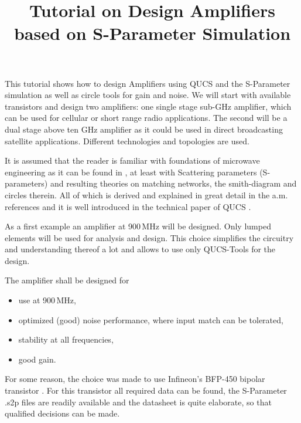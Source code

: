 \graphicspath{{./pics/}}
\title{Tutorial on Design Amplifiers based on S-Parameter Simulation}
\maketitle
{}

This tutorial shows how to design Amplifiers using QUCS \cite{qucs}
and the S-Parameter simulation as well as circle tools for gain and
noise. We will start with available transistors and design two
amplifiers: one single stage sub-GHz amplifier, which can be used for
cellular or short range radio applications. The second will be a dual
stage above ten GHz amplifier as it could be used in direct
broadcasting satellite applications. Different technologies and
topologies are used.

It is assumed that the reader is familiar with foundations of
microwave engineering as it can be found in \cite{col91,poz05}, at
least with Scattering parameters (S-parameters) and resulting theories
on matching networks, the smith-diagram and circles therein. All of
which is derived and explained in great detail in the a.m. references
and it is well introduced in the technical paper of QUCS \cite{qucs}.


As a first example an amplifier at 900\,MHz will be designed. Only
lumped elements will be used for analysis and design. This choice
simplifies the circuitry and understanding thereof a lot and allows to
use only QUCS-Tools for the design.

The amplifier shall be designed for
\begin{itemize}
\item use at 900\,MHz,
\item optimized (good) noise performance, where input match can be tolerated,
\item stability at all frequencies,
\item good gain.
\end{itemize}



For some reason, the choice was made to use Infineon's BFP-450 bipolar
transistor \cite{infbfp450}. For this transistor all required data can
be found, the S-Parameter .s2p files are readily available and the
datasheet is quite elaborate, so that qualified decisions can be made.

